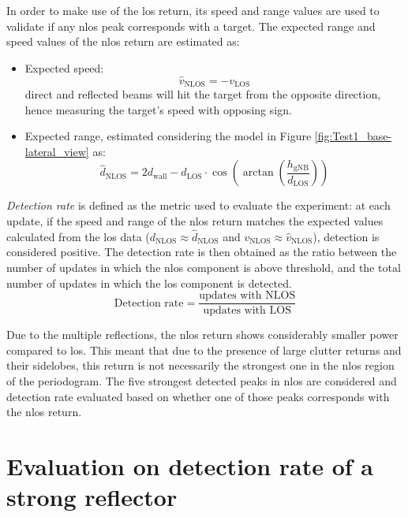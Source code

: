 In order to make use of the \gls{los} return, its speed and range values are used to validate if any \gls{nlos} peak corresponds with a target.
The expected range and speed values of the \gls{nlos} return are estimated as:
\begin{itemize}
	\item Expected speed:
	$$ \hat{v}_{\text{NLOS}} = -v_{\text{LOS}}$$
	direct and reflected beams will hit the target from the opposite direction, hence measuring the target's speed with opposing sign.
	\item Expected range, estimated considering the model in Figure \ref{fig:Test1_base-lateral_view} as:
	$$ \hat{d}_{\text{NLOS}} = 2 d_{\text{wall}} - d_{\text{LOS}}\cdot \cos{\left(\arctan{\left(\frac{h_{\text{gNB}}}{d_{\text{LOS}}}\right)}\right)}$$
\end{itemize}

\textit{Detection rate} is defined as the metric used to evaluate the experiment: at each update, if the speed and range of the \gls{nlos} return matches the expected values calculated from the \gls{los} data ($d_{\text{NLOS}} \approx  \hat{d}_{\text{NLOS}}$ and $v_{\text{NLOS}} \approx \hat{v}_{\text{NLOS}}$), detection is considered positive.
The detection rate is then obtained as the ratio between the number of updates in which the \gls{nlos} component is above threshold, and the total number of updates in which the \gls{los} component is detected.
\begin{equation*}
	\text{Detection rate} = \frac{\text{updates with NLOS}}{\text{updates with LOS}}
\end{equation*}

Due to the multiple reflections, the \gls{nlos} return shows considerably smaller power compared to \gls{los}.
This meant that due to the presence of large clutter returns and their sidelobes, this return is not necessarily the strongest one in the \gls{nlos} region of the periodogram.
The five strongest detected peaks in \gls{nlos} are considered and detection rate evaluated based on whether one of those peaks corresponds with the \gls{nlos} return.

\section{Evaluation on detection rate of a strong reflector}

